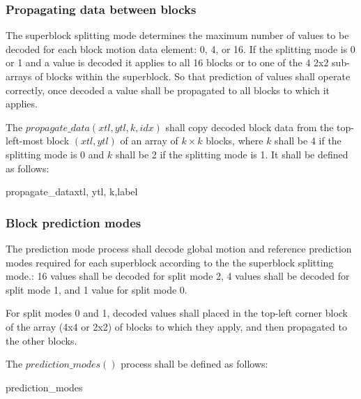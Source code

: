 \subsubsection{Propagating data between blocks}
\label{propagatedata}

The superblock splitting mode determines the maximum number of values to be
decoded for each block motion data element: 0, 4, or 16. If the splitting mode
is 0 or 1 and a value is decoded it applies to all 16 blocks or to one of the 4 2x2 
sub-arrays of blocks within the superblock. So that prediction of values shall
operate correctly, once decoded a value shall be propagated to all blocks to
which it applies.

The $propagate\_data(xtl, ytl, k,idx)$ shall copy decoded block data from the 
top-left-most block $(xtl, ytl)$ of an array of $k\times k$ blocks, where $k$ shall be 4 if the
splitting mode is 0 and $k$ shall be 2 if the splitting mode is 1. It shall be defined
as follows:

\begin{pseudo}{propagate\_data}{xtl, ytl, k,label}
        \bsCODE{\BlockData[y][x][label]=\BlockData[ytl][xtl][label]}
    \bsEND
\bsEND
\end{pseudo}

\subsubsection{Block prediction modes}
\label{blockpredmodes}

The prediction mode process shall decode global motion and reference
 prediction modes required for each superblock according to the
the superblock splitting mode.: 16 values shall be decoded for split mode 2, 
4 values shall be decoded for split mode 1, and 1 value for split mode 0. 

For split modes 0 and 1, decoded values shall placed in the top-left corner block 
of the array (4x4 or 2x2) of blocks to which they apply, and then propagated to the 
other blocks.

The $prediction\_modes()$ process shall be defined as follows:

\begin{pseudo}{prediction\_modes}{}
           \bsEND
        \bsEND
    \bsEND
\bsEND
{}
\end{pseudo}

